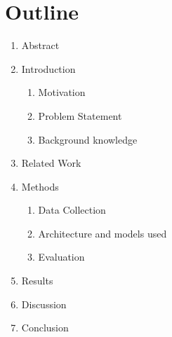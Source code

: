 
\section{Outline}

{

  \begin{enumerate}
    \item Abstract
    \item Introduction
    \begin{enumerate}
      \item Motivation
      \item Problem Statement
      \item Background knowledge
    \end{enumerate}
    \item Related Work
    \item Methods
    \begin{enumerate}
      \item Data Collection
      \item Architecture and models used
      \item Evaluation
    \end{enumerate}
    \item Results
    \item Discussion
    \item Conclusion
  \end{enumerate}
}
